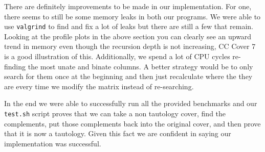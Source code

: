 \documentclass[10pt]{article}
\begin{document}
There are definitely improvements to be made in our implementation. For one,
there seems to still be some memory leaks in both our programs. We were able to
use \texttt{valgrind} to find and fix a lot of leaks but there are still a few
that remain. Looking at the profile plots in the above section you can clearly
see an upward trend in memory even though the recursion depth is not
increasing, CC Cover 7 is a good illustration of this. Additionally, we spend a
lot of CPU cycles re-finding the most unate and binate columns. A better
strategy would be to only search for them once at the beginning and then just
recalculate where the they are every time we modify the matrix instead of
re-searching.

In the end we were able to successfully run all the provided benchmarks and our
\texttt{test.sh} script proves that we can take a non tautology cover, find the
complements, put those complements back into the original cover, and then prove
that it is now a tautology. Given this fact we are confident in saying our
implementation was successful.
\end{document}
